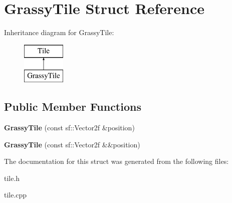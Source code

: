 \hypertarget{structGrassyTile}{}\section{Grassy\+Tile Struct Reference}
\label{structGrassyTile}
Inheritance diagram for Grassy\+Tile\+:\begin{figure}[H]
\begin{center}
\leavevmode
\includegraphics[height=2.000000cm]{structGrassyTile}
\end{center}
\end{figure}
\subsection*{Public Member Functions}
\begin{DoxyCompactItemize}
\item 
\mbox{\label{structGrassyTile_af97dac68cb91fc462274d16d85e20e92}} 
{\bfseries Grassy\+Tile} (const sf\+::\+Vector2f \&position)
\item 
\mbox{\label{structGrassyTile_acd1aa8c780a09b87e0bb4b39a435c536}} 
{\bfseries Grassy\+Tile} (const sf\+::\+Vector2f \&\&position)
\end{DoxyCompactItemize}


The documentation for this struct was generated from the following files\+:\begin{DoxyCompactItemize}
\item 
tile.\+h\item 
tile.\+cpp\end{DoxyCompactItemize}
